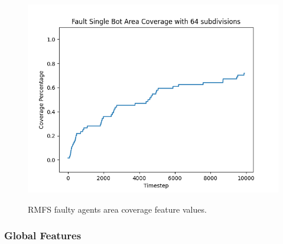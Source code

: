 \documentclass[../../Thesis.tex]{subfiles}
\begin{document}
\begin{figure}[H]
{						\includegraphics[scale=0.22]{../../Images/Experiments/warehouse_6x6_10_percent_slowed_at_10fault20211028_17_24/Fault_Single_Bot_Area_Coverage_with_64_subdivisions.png}
					}
					\caption{RMFS faulty agents area coverage feature values.}
					\label{fig:RMFS_faulty_agents_area_coverage}
				\end{figure}
			
			\subsubsection{Global Features}
				
\end{document}
